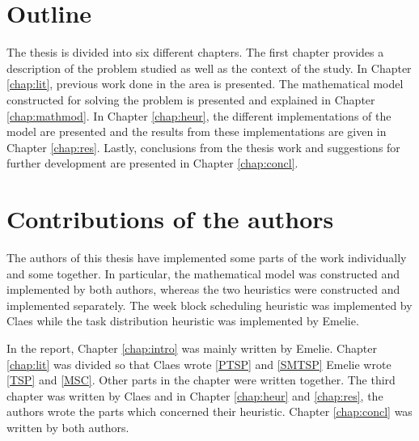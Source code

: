 \section{Outline}

The thesis is divided into six different chapters. The first chapter provides a description of the problem studied as well as the context of the study. In Chapter \ref{chap:lit}, previous work done in the area is presented. The mathematical model constructed for solving the problem is presented and explained in Chapter \ref{chap:mathmod}. In Chapter \ref{chap:heur}, the different implementations of the model are presented and the results from these implementations are given in Chapter \ref{chap:res}. Lastly, conclusions from the thesis work and suggestions for further development are presented in Chapter \ref{chap:concl}.

\section{Contributions of the authors}

The authors of this thesis have implemented some parts of the work individually and some together. In particular, the mathematical model was constructed and implemented by both authors, whereas the two heuristics were constructed and implemented separately. The week block scheduling heuristic was implemented by Claes while the task distribution heuristic was implemented by Emelie.

In the report, Chapter \ref{chap:intro} was mainly written by Emelie. Chapter \ref{chap:lit} was divided so that Claes wrote \ref{PTSP} and \ref{SMTSP} Emelie wrote \ref{TSP} and \ref{MSC}. Other parts in the chapter were written together. The third chapter was written by Claes and in Chapter \ref{chap:heur} and \ref{chap:res}, the authors wrote the parts which concerned their heuristic. Chapter \ref{chap:concl} was written by both authors.
 

